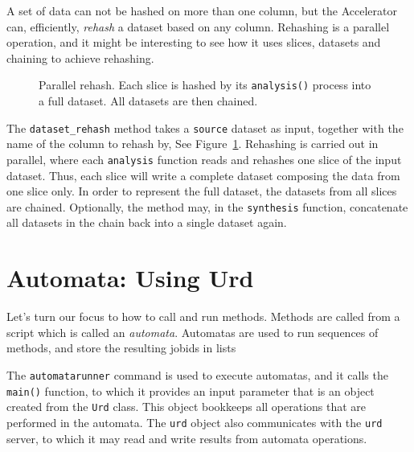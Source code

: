 \documentclass[a4paper]{article}
\begin{document}
A set of data can not be hashed on more than one column, but the
Accelerator can, efficiently, \textsl{rehash} a dataset based on any
column.  Rehashing is a parallel operation, and it might be
interesting to see how it uses slices, datasets and chaining to
achieve rehashing.

\begin{figure}[h!]
  \begin{center}
    
    \caption{Parallel rehash.  Each slice is hashed by its
      \texttt{analysis()} process into a full dataset.  All datasets
      are then chained.}
    \label{fig:rehash}
  \end{center}
\end{figure}

The \texttt{dataset\_rehash} method takes a \texttt{source} dataset as
input, together with the name of the column to rehash by, See
Figure~\ref{fig:rehash}.  Rehashing is carried out in parallel, where
each \texttt{analysis} function reads and rehashes one slice of the
input dataset.  Thus, each slice will write a complete dataset
composing the data from one slice only.  In order to represent the
full dataset, the datasets from all slices are chained.  Optionally,
the method may, in the \texttt{synthesis} function, concatenate all
datasets in the chain back into a single dataset again.

\clearpage





\section{Automata:  Using Urd}
Let's turn our focus to how to call and run methods.  Methods are
called from a script which is called an \textsl{automata}.  Automatas
are used to run sequences of methods, and store the resulting jobids
in lists 



The \texttt{automatarunner} command is used to execute automatas, and
it calls the \texttt{main()} function, to which it provides an input
parameter that is an object created from the \texttt{Urd} class.  This
object bookkeeps all operations that are performed in the automata.
The \texttt{urd} object also communicates with the \texttt{urd}
server, to which it may read and write results from automata operations.
\end{document}
